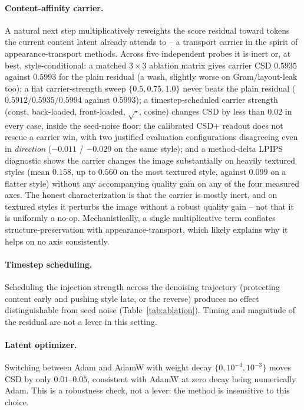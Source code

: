 \documentclass[letterpaper]{article} %
\begin{document}
\paragraph{Content-affinity carrier.}
A natural next step multiplicatively reweights the score residual toward
tokens the current content latent already attends to -- a transport carrier in
the spirit of appearance-transport methods. Across five independent probes it
is inert or, at best, style-conditional: a matched $3\times3$ ablation matrix
gives carrier CSD $0.5935$ against $0.5993$ for the plain residual (a wash,
slightly worse on Gram/layout-leak too); a flat carrier-strength sweep
$\{0.5,0.75,1.0\}$ never beats the plain residual ($0.5912/0.5935/0.5994$
against $0.5993$); a timestep-scheduled carrier strength (const, back-loaded,
front-loaded, $\sqrt{\cdot}$, cosine) changes CSD by less than $0.02$ in every
case, inside the seed-noise floor; the calibrated CSD+ readout does not rescue
a carrier win, with two justified evaluation configurations disagreeing even in
\emph{direction} ($-0.011$ / $-0.029$ on the same style); and a method-delta
LPIPS diagnostic shows the carrier changes the image substantially on heavily
textured styles (mean $0.158$, up to $0.560$ on the most textured style,
against $0.099$ on a flatter style) without any accompanying quality gain on
any of the four measured axes. The honest characterization is that the carrier
is mostly inert, and on textured styles it perturbs the image without a robust
quality gain -- not that it is uniformly a no-op. Mechanistically, a single
multiplicative term conflates structure-preservation with appearance-transport,
which likely explains why it helps on no axis consistently.

\paragraph{Timestep scheduling.}
Scheduling the injection strength across the denoising trajectory (protecting
content early and pushing style late, or the reverse) produces no effect
distinguishable from seed noise (Table~\ref{tab:ablation}). Timing and
magnitude of the residual are not a lever in this setting.

\paragraph{Latent optimizer.}
Switching between Adam and AdamW with weight decay $\{0,10^{-4},10^{-3}\}$
moves CSD by only $0.01$--$0.05$, consistent with AdamW at zero decay being
numerically Adam. This is a robustness check, not a lever: the method is
insensitive to this choice.
\end{document}
